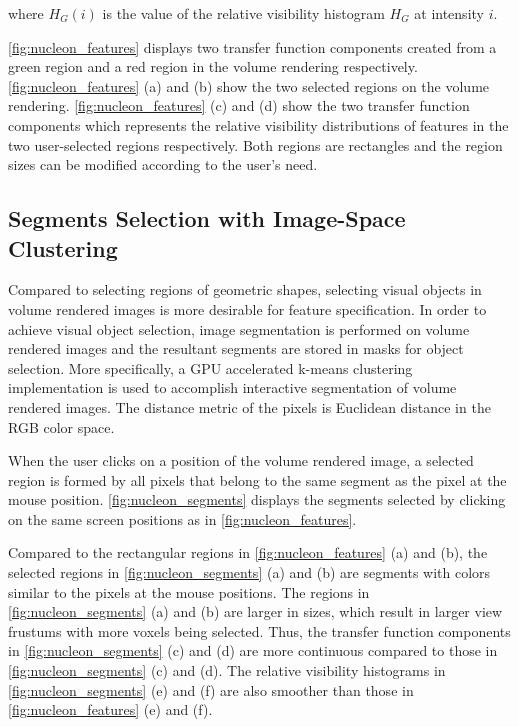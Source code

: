 \documentclass[twoside,twocolumn,10pt]{article}
\begin{document}
where $ H_{G}(i) $ is the value of the relative visibility histogram $ H_{G} $ at intensity $ i $.

\autoref{fig:nucleon_features} displays two transfer function components created from a green region and a red region in the volume rendering respectively.
\autoref{fig:nucleon_features} (a) and (b) show the two selected regions on the volume rendering. \autoref{fig:nucleon_features} (c) and (d) show the two transfer function components which represents the relative visibility distributions of features in the two user-selected regions respectively. Both regions are rectangles and the region sizes can be modified according to the user's need.

\subsection{Segments Selection with Image-Space Clustering}
Compared to selecting regions of geometric shapes, selecting visual objects in volume rendered images is more desirable for feature specification.
In order to achieve visual object selection, image segmentation is performed on volume rendered images and the resultant segments are stored in masks for object selection. More specifically, a GPU accelerated k-means clustering implementation is used to accomplish interactive segmentation of volume rendered images. The distance metric of the pixels is Euclidean distance in the RGB color space.

When the user clicks on a position of the volume rendered image, a selected region is formed by all pixels that belong to the same segment as the pixel at the mouse position.
\autoref{fig:nucleon_segments} displays the segments selected by clicking on the same screen positions as in \autoref{fig:nucleon_features}.

Compared to the rectangular regions in \autoref{fig:nucleon_features} (a) and (b), the selected regions in \autoref{fig:nucleon_segments} (a) and (b) are segments with colors similar to the pixels at the mouse positions. The regions in \autoref{fig:nucleon_segments} (a) and (b) are larger in sizes, which result in larger view frustums with more voxels being selected. Thus, the transfer function components in \autoref{fig:nucleon_segments} (c) and (d) are more continuous compared to those in \autoref{fig:nucleon_segments} (c) and (d). The relative visibility histograms in \autoref{fig:nucleon_segments} (e) and (f) are also smoother than those in \autoref{fig:nucleon_features} (e) and (f).
\end{document}
